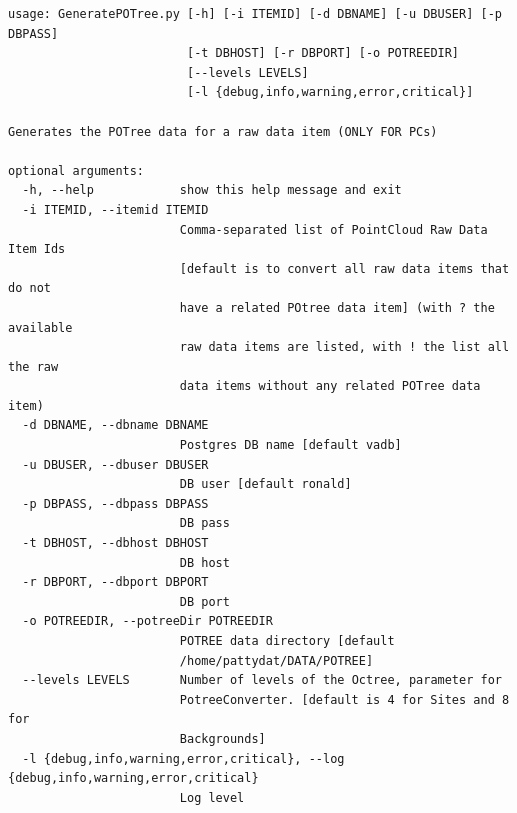 \begin{Verbatim}[fontfamily=courier,commandchars=\\\{\},fontsize=\footnotesize]
usage: GeneratePOTree.py [-h] [-i ITEMID] [-d DBNAME] [-u DBUSER] [-p DBPASS]
                         [-t DBHOST] [-r DBPORT] [-o POTREEDIR]
                         [--levels LEVELS]
                         [-l {debug,info,warning,error,critical}]

Generates the POTree data for a raw data item (ONLY FOR PCs)

optional arguments:
  -h, --help            show this help message and exit
  -i ITEMID, --itemid ITEMID
                        Comma-separated list of PointCloud Raw Data Item Ids
                        [default is to convert all raw data items that do not
                        have a related POtree data item] (with ? the available
                        raw data items are listed, with ! the list all the raw
                        data items without any related POTree data item)
  -d DBNAME, --dbname DBNAME
                        Postgres DB name [default vadb]
  -u DBUSER, --dbuser DBUSER
                        DB user [default ronald]
  -p DBPASS, --dbpass DBPASS
                        DB pass
  -t DBHOST, --dbhost DBHOST
                        DB host
  -r DBPORT, --dbport DBPORT
                        DB port
  -o POTREEDIR, --potreeDir POTREEDIR
                        POTREE data directory [default
                        /home/pattydat/DATA/POTREE]
  --levels LEVELS       Number of levels of the Octree, parameter for
                        PotreeConverter. [default is 4 for Sites and 8 for
                        Backgrounds]
  -l {debug,info,warning,error,critical}, --log {debug,info,warning,error,critical}
                        Log level
\end{Verbatim}

